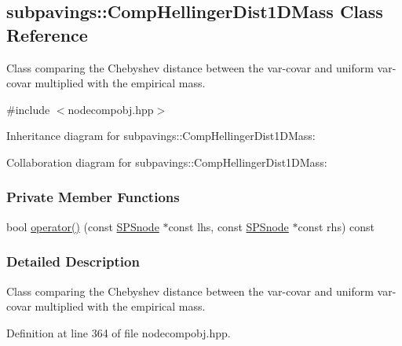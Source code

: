 \hypertarget{classsubpavings_1_1CompHellingerDist1DMass}{\subsection{subpavings\-:\-:\-Comp\-Hellinger\-Dist1\-D\-Mass \-Class \-Reference}
\label{classsubpavings_1_1CompHellingerDist1DMass}
}


\-Class comparing the \-Chebyshev distance between the var-\/covar and uniform var-\/covar multiplied with the empirical mass.  




{\ttfamily \#include $<$nodecompobj.\-hpp$>$}



\-Inheritance diagram for subpavings\-:\-:\-Comp\-Hellinger\-Dist1\-D\-Mass\-:


\-Collaboration diagram for subpavings\-:\-:\-Comp\-Hellinger\-Dist1\-D\-Mass\-:
\subsubsection*{\-Private \-Member \-Functions}
\begin{DoxyCompactItemize}
\item 
bool \hyperlink{classsubpavings_1_1CompHellingerDist1DMass_a9b8a611439eef8ab2cb3c71315b2cf5f}{operator()} (const \hyperlink{classsubpavings_1_1SPSnode}{\-S\-P\-Snode} $\ast$const lhs, const \hyperlink{classsubpavings_1_1SPSnode}{\-S\-P\-Snode} $\ast$const rhs) const 
\end{DoxyCompactItemize}


\subsubsection{\-Detailed \-Description}
\-Class comparing the \-Chebyshev distance between the var-\/covar and uniform var-\/covar multiplied with the empirical mass. 

\-Definition at line 364 of file nodecompobj.\-hpp.



